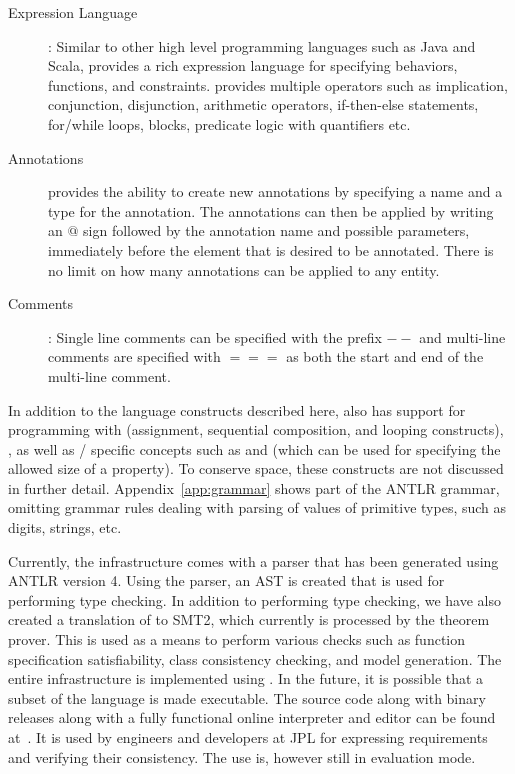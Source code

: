 \begin{description}
\item [Expression Language]: Similar to other high level programming
  languages such as Java and Scala, \Klang{} provides a rich
  expression language for specifying behaviors, functions, and
  constraints. \Klang{} provides multiple operators such as
  implication, conjunction, disjunction, arithmetic operators,
  if-then-else statements, for/while loops, blocks, predicate logic
  with quantifiers etc. 

\item [Annotations] \Klang{} provides the ability to create new
  annotations by specifying a name and a type for the annotation. The
  annotations can then be applied by writing an $@$ sign followed by
  the annotation name and possible parameters, immediately before the 
  element that is desired to be annotated. There is no limit on how many 
  annotations can be applied to any entity. 

\item [Comments]: Single line comments can be specified with the
  prefix $--$ and multi-line comments are specified with $===$ as both
  the start and end of the multi-line comment.

\end{description}

In addition to the language constructs described here, \Klang{} also
has support for programming with  (assignment,
sequential composition, and looping constructs), , as well as \sysml{}/\uml{} specific concepts such as
 and  (which can be used for
specifying the allowed size of a property).  To conserve space, these
constructs are not discussed in further detail.
Appendix~\ref{app:grammar} shows part of the \Klang{} ANTLR grammar,
omitting grammar rules dealing with parsing of values of primitive
types, such as digits, strings, etc.

Currently, the \Klang{} infrastructure comes with a parser that has
been generated using ANTLR version 4. Using the parser, an AST is
created that is used for performing type checking. In addition to
performing type checking, we have also created a translation of
\Klang{} to SMT2, which currently is processed by the \zthree{}
theorem prover.  This is used as a means to perform various checks
such as function specification satisfiability, class consistency
checking, and model generation. The entire \Klang{} infrastructure is
implemented using \scala. In the future, it is possible that a subset
of the language is made executable. The source code along with binary
releases along with a fully functional online interpreter and \Klang{}
editor can be found at~\cite{theklanguage}. It is used by engineers and
developers at JPL for expressing requirements and verifying their
consistency. The use is, however still in evaluation mode.

 
